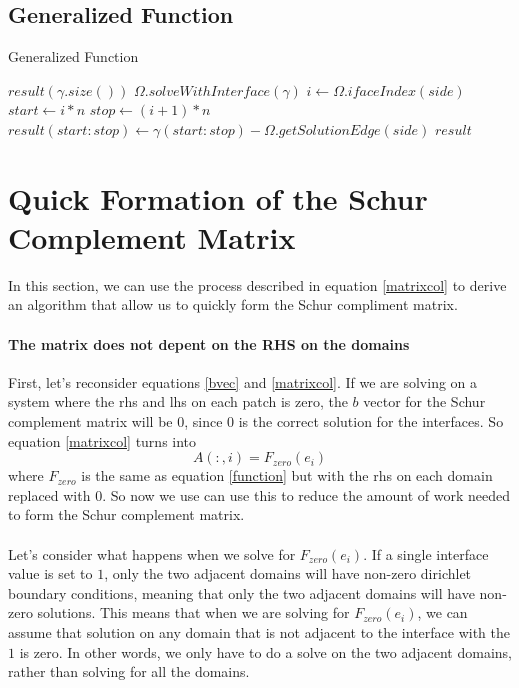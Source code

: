 \documentclass[12pt]{article}
\begin{document}
\subsection{Generalized Function}
\begin{algorithm}[H]
\caption{Generalized Function}
\begin{algorithmic}[1]
    \State $result(\gamma.size())$ 
        \State $\Omega.solveWithInterface(\gamma)$
                \State $i \gets \Omega.ifaceIndex(side)$
                \State $start \gets i*n$
                \State $stop \gets (i+1)*n$
                \State $result(start:stop) \gets \gamma(start:stop) - \Omega.getSolutionEdge(side)$
            \EndIf
        \EndFor
    \EndFor
    \State \Return $result$
    \EndProcedure
\end{algorithmic}
\end{algorithm}

\section{Quick Formation of the Schur Complement Matrix}
In this section, we can use the process described in equation \eqref{matrixcol} to derive an algorithm
that allow us to quickly form the Schur compliment matrix.
\paragraph{The matrix does not depent on the RHS on the domains}
First, let's reconsider equations  \eqref{bvec} and \eqref{matrixcol}. If we are solving on a system
where the rhs and lhs on each patch is zero, the $b$ vector for the Schur complement matrix will
be $0$, since $0$ is the correct solution for the interfaces. So equation \ref{matrixcol} turns into
\begin{equation}
    A(:,i) = F_{zero}(e_i)
\end{equation}
where $F_{zero}$ is the same as equation \ref{function} but with the rhs on each domain replaced 
with $0$.
So now we use can use this to reduce the amount of work needed to form the Schur complement matrix.
\\
\\
Let's consider what happens when we solve for $F_{zero}(e_i)$. If a single interface value is set
to $1$, only the two adjacent domains will have non-zero dirichlet boundary conditions, meaning that
only the two adjacent domains will have non-zero solutions. This means that when we are solving for 
$F_{zero}(e_i)$, we can  assume that solution on any domain that is not adjacent to the interface
with the $1$ is zero. In other words, we only have to do a solve on the two adjacent domains, rather
than solving for all the domains.
\end{document}
